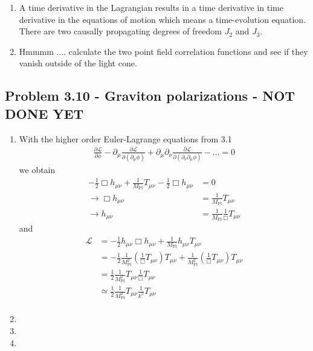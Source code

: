 \documentclass[10pt,a4paper]{book}
\theoremstyle{definition}
\begin{document}
\begin{enumerate}[label=(\alph*)]
\item A time derivative in the Lagrangian results in a time derivative in time derivative in the equations of motion which means a time-evolution equation. There are two causally propagating degrees of freedom $J_2$ and $J_3$.

\item Hmmmm .... calculate the two point field correlation functions and see if they vanish outside of the light cone.

\end{enumerate}


\subsection{Problem 3.10 - Graviton polarizations - NOT DONE YET}
\begin{enumerate}[label=(\alph*)]
\item With the higher order Euler-Lagrange equations from 3.1
\begin{align}
\frac{\partial \mathcal{L}}{\partial\phi}
- \partial_\mu\frac{\partial \mathcal{L}}{\partial(\partial_\mu\phi)}
+\partial_\mu\partial_\nu\frac{\partial \mathcal{L}}{\partial(\partial_\nu\partial_\mu\phi)}-...=0
\end{align}
we obtain
\begin{align}
-\frac{1}{2}\Box h_{\mu\nu}+\frac{1}{M_\text{Pl}}T_{\mu\nu}-\frac{1}{2}\Box h_{\mu\nu}&=0\\
\rightarrow \Box h_{\mu\nu}&=\frac{1}{M_\text{Pl}}T_{\mu\nu}\\
\rightarrow h_{\mu\nu}&=\frac{1}{M_\text{Pl}}\frac{1}{\Box}T_{\mu\nu}
\end{align}
and
\begin{align}
\mathcal{L}
&=-\frac{1}{2}h_{\mu\nu}\Box h_{\mu\nu}+\frac{1}{M_\text{Pl}}h_{\mu\nu}T_{\mu\nu}\\
&=-\frac{1}{2}\frac{1}{M_\text{Pl}^2}(\frac{1}{\Box} T_{\mu\nu})T_{\mu\nu}+\frac{1}{M_\text{Pl}^2}(\frac{1}{\Box} T_{\mu\nu})T_{\mu\nu}\\
&=\frac{1}{2}\frac{1}{M_\text{Pl}^2}T_{\mu\nu}\frac{1}{\Box} T_{\mu\nu}\\
&\simeq\frac{1}{2}\frac{1}{M_\text{Pl}^2}T_{\mu\nu}\frac{1}{k^2} T_{\mu\nu}\\
\end{align}
\item
\item
\item
\end{enumerate}
\end{document}
